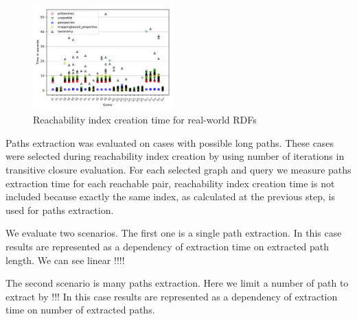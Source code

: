 \begin{figure}
   \includegraphics[width=0.48\textwidth]{data/other_all.pdf}
   \caption{Reachability index creation time for real-world RDFs}
   \label{fig:other_all_qs}
\end{figure}

Paths extraction was evaluated on cases with possible long paths.
These cases were selected during reachability index creation by using number of iterations in transitive closure evaluation.
For each selected graph and query we measure paths extraction time for each reachable pair, reachability index creation time is not included because exactly the same index, as calculated at the previous step, is used for paths extraction. 

We evaluate two scenarios.
The first one is a single path extraction.
In this case results are represented as a dependency of extraction time on extracted path length.
We can see linear !!!!

The second scenario is many paths extraction.
Here we limit a number of path to extract by !!! 
In this case results are represented as a dependency of extraction time on number of extracted paths.


